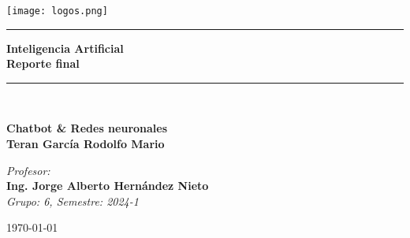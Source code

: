 


\begin{titlepage}

\newcommand{\linea}{\rule{\linewidth}{0.7mm}}                 
\center

\texttt{[image: logos.png]}\\[0.02cm]
\vfill

\linea
\vfill
\textbf{\Large Inteligencia Artificial}\\[0.3cm]
\textbf{\Large Reporte final}\\[0.8cm]
\linea \\
\vfill

\textbf{\large Chatbot \& Redes neuronales}\\

    \vfill
    \textbf{\large  \textbf{Teran García Rodolfo Mario}}\\
    \vfill

    \textit{\small Profesor:}\\
    \textbf{Ing. Jorge Alberto Hernández Nieto}\\
    \textit{\small Grupo: 6,  Semestre: 2024-1}
    \vfill

    {\large \today}\\
    \newpage
    \end{titlepage}

